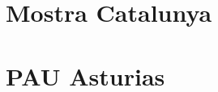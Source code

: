 \documentclass[12pt]{article}
\begin{document}
\section*{Mostra Catalunya}
\begin{enumerate}

\end{enumerate}


\section*{PAU Asturias}
\begin{enumerate}

\end{enumerate}
\end{document}
